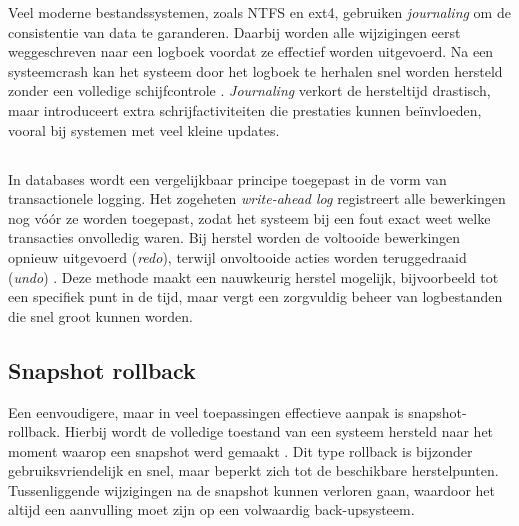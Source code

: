 Veel moderne bestandssystemen, zoals NTFS en ext4, gebruiken \textit{journaling} om de consistentie van data te garanderen. Daarbij worden alle wijzigingen eerst weggeschreven naar een logboek voordat ze effectief worden uitgevoerd. Na een systeemcrash kan het systeem door het logboek te herhalen snel worden hersteld zonder een volledige schijfcontrole \autocite{Nakamura2020}. \textit{Journaling} verkort de hersteltijd drastisch, maar introduceert extra schrijfactiviteiten die prestaties kunnen beïnvloeden, vooral bij systemen met veel kleine updates.

\subsection{}%
\label{subsec:transactionele-log}

In databases wordt een vergelijkbaar principe toegepast in de vorm van transactionele logging. Het zogeheten \textit{write-ahead log} registreert alle bewerkingen nog vóór ze worden toegepast, zodat het systeem bij een fout exact weet welke transacties onvolledig waren. Bij herstel worden de voltooide bewerkingen opnieuw uitgevoerd (\textit{redo}), terwijl onvoltooide acties worden teruggedraaid (\textit{undo}) \autocite{Takdir2025}. Deze methode maakt een nauwkeurig herstel mogelijk, bijvoorbeeld tot een specifiek punt in de tijd, maar vergt een zorgvuldig beheer van logbestanden die snel groot kunnen worden.

\subsection{Snapshot rollback}%
\label{subsec:snapshot-rollback}

Een eenvoudigere, maar in veel toepassingen effectieve aanpak is snapshot-rollback. Hierbij wordt de volledige toestand van een systeem hersteld naar het moment waarop een snapshot werd gemaakt \autocite{BtrfsDevelopers2025}. Dit type rollback is bijzonder gebruiksvriendelijk en snel, maar beperkt zich tot de beschikbare herstelpunten. Tussenliggende wijzigingen na de snapshot kunnen verloren gaan, waardoor het altijd een aanvulling moet zijn op een volwaardig back-upsysteem.

\section{}%
\label{sec:vergelijkingen-uitdagingen}

